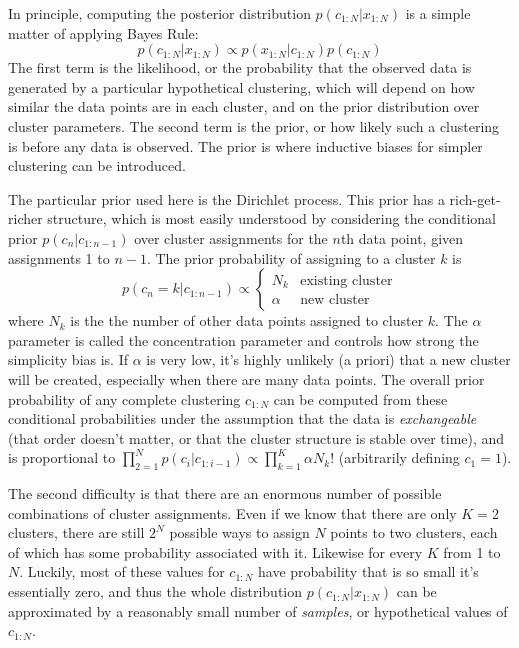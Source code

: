 \documentclass[10pt,letterpaper]{article}
\begin{document}
In principle, computing the posterior distribution
\(p(c_{1:N} | x_{1:N})\) is a simple matter of applying Bayes Rule: \[
    p(c_{1:N} | x_{1:N}) \propto p(x_{1:N} | c_{1:N}) p(c_{1:N})
\] The first term is the likelihood, or the probability that the
observed data is generated by a particular hypothetical clustering,
which will depend on how similar the data points are in each cluster,
and on the prior distribution over cluster parameters. The second term
is the prior, or how likely such a clustering is before any data is
observed. The prior is where inductive biases for simpler clustering can
be introduced.

The particular prior used here is the Dirichlet process. This prior has
a rich-get-richer structure, which is most easily understood by
considering the conditional prior \(p(c_n | c_{1:n-1})\) over cluster
assignments for the \(n\)th data point, given assignments 1 to \(n-1\).
The prior probability of assigning to a cluster \(k\) is \[
    p(c_n=k | c_{1:n-1}) \propto \left\{
        \begin{array}{ll}
            N_k    & \textrm{existing cluster} \\
            \alpha & \textrm{new cluster}
        \end{array}\right.
\] where \(N_k\) is the the number of other data points assigned to
cluster \(k\). The \(\alpha\) parameter is called the concentration
parameter and controls how strong the simplicity bias is. If \(\alpha\)
is very low, it's highly unlikely (a priori) that a new cluster will be
created, especially when there are many data points. The overall prior
probability of any complete clustering \(c_{1:N}\) can be computed from
these conditional probabilities under the assumption that the data is
\emph{exchangeable} (that order doesn't matter, or that the cluster
structure is stable over time), and is proportional to
\(\prod_{2=1}^{N} p(c_i | c_{1:i-1}) \propto \prod_{k=1}^K \alpha N_k!\)
(arbitrarily defining \(c_1 = 1\)).

The second difficulty is that there are an enormous number of possible
combinations of cluster assignments. Even if we know that there are only
\(K=2\) clusters, there are still \(2^N\) possible ways to assign \(N\)
points to two clusters, each of which has some probability associated
with it. Likewise for every \(K\) from 1 to \(N\). Luckily, most of
these values for \(c_{1:N}\) have probability that is so small it's
essentially zero, and thus the whole distribution
\(p(c_{1:N} | x_{1:N})\) can be approximated by a reasonably small
number of \emph{samples}, or hypothetical values of \(c_{1:N}\).
\end{document}
